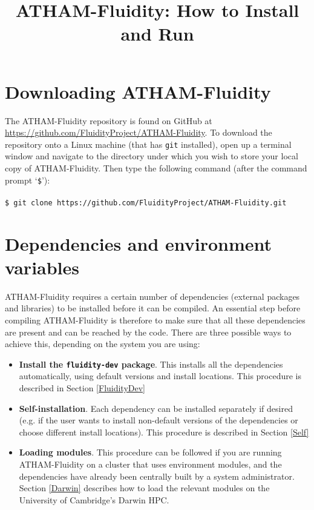 \documentclass[10pt,a4paper]{article}
\title{ATHAM-Fluidity: How to Install and Run}
\date{}
\newcommand\tab[1][0.5cm]{\hspace*{#1}}
\begin{document}
\maketitle
\tableofcontents


\section{Downloading ATHAM-Fluidity}
The ATHAM-Fluidity repository is found on GitHub at \url{https://github.com/FluidityProject/ATHAM-Fluidity}. To download the repository onto a Linux machine (that has \texttt{git} installed), open up a terminal window and navigate to the directory under which you wish to store your local copy of ATHAM-Fluidity. Then type the following command (after the command prompt `\texttt{\$}'):\\\\
\tab \texttt{\$ git clone https://github.com/FluidityProject/ATHAM-Fluidity.git}

\section{Dependencies and environment variables} \label{Dependencies}
ATHAM-Fluidity requires a certain number of dependencies (external packages and libraries) to be installed before it can be compiled. An essential step before compiling ATHAM-Fluidity is therefore to make sure that all these dependencies are present and can be reached by the code. There are three possible ways to achieve this, depending on the system you are using:
\begin{itemize}
\item \textbf{Install the \texttt{fluidity-dev} package}. This installs all the dependencies automatically, using default versions and install locations. This procedure is described in Section \ref{FluidityDev}
\item \textbf{Self-installation}. Each dependency can be installed separately if desired (e.g. if the user wants to install non-default versions of the dependencies or choose different install locations). This procedure is described in Section \ref{Self}
\item \textbf{Loading modules}. This procedure can be followed if you are running ATHAM-Fluidity on a cluster that uses environment modules, and the dependencies have already been centrally built by a system administrator. Section \ref{Darwin} describes how to load the relevant modules on the University of Cambridge's Darwin HPC.
\end{itemize}
\end{document}

